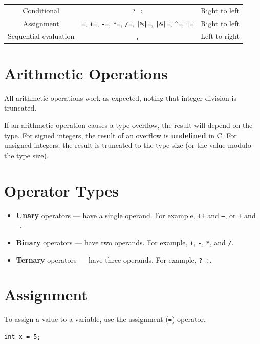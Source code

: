 \documentclass[a4paper]{report}
\begin{document}
\begin{table}[H]
\begin{tabular}{c c c}
        Conditional                   & \texttt{? :}                                                                                                                                                                                                       & Right to left                  \\ %
        Assignment                    & \texttt{=}, \texttt{+=}, \texttt{-=}, \texttt{*=}, \texttt{/=}, \texttt{|\%|=}, \texttt{|\&|=}, \texttt{^=}, \texttt{|=} & Right to left                  \\
        Sequential evaluation         & \texttt{,}                                                                                                                                                                                                         & Left to right                  \\
        \bottomrule
    \end{tabular}
\end{table}
\section{Arithmetic Operations}
All arithmetic operations work as expected, noting that integer division is truncated.

If an arithmetic operation causes a type overflow, the result will depend on the type.
For signed integers, the result of an overflow is \textbf{undefined} in C. For unsigned integers,
the result is truncated to the type size (or the value modulo the type size).
\section{Operator Types}
\begin{itemize}
    \item \textbf{Unary} operators --- have a single operand. For example, \texttt{++} and \texttt{--}, or \texttt{+} and \texttt{-}.
    \item \textbf{Binary} operators --- have two operands. For example, \texttt{+}, \texttt{-}, \texttt{*}, and \texttt{/}.
    \item \textbf{Ternary} operators --- have three operands. For example, \texttt{? :}. %
\end{itemize}
\section{Assignment}
To assign a value to a variable, use the assignment (\texttt{=}) operator.
\begin{verbatim}
int x = 5;
\end{verbatim}
\end{document}

